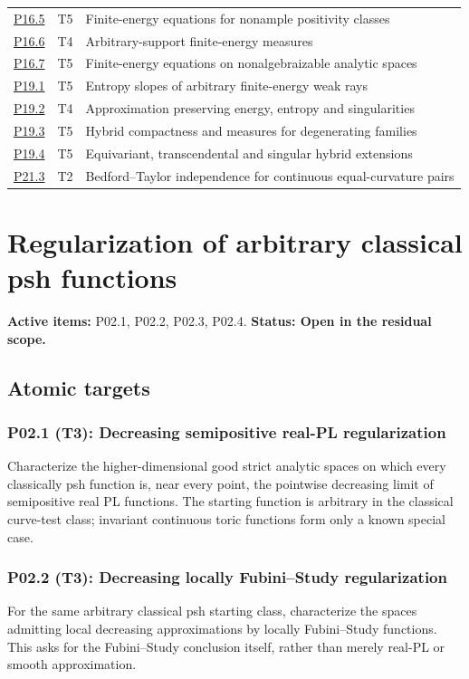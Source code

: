 \documentclass[11pt,a4paper]{article}
\theoremstyle{definition}
\theoremstyle{remark}
\begin{document}
\begin{longtable}{@{}p{}p{}p{}@{}}
\hyperref[atom:P16.5]{P16.5} & T5 & Finite-energy equations for nonample positivity classes\\
\hyperref[atom:P16.6]{P16.6} & T4 & Arbitrary-support finite-energy measures\\
\hyperref[atom:P16.7]{P16.7} & T5 & Finite-energy equations on nonalgebraizable analytic spaces\\
\hyperref[atom:P19.1]{P19.1} & T5 & Entropy slopes of arbitrary finite-energy weak rays\\
\hyperref[atom:P19.2]{P19.2} & T4 & Approximation preserving energy, entropy and singularities\\
\hyperref[atom:P19.3]{P19.3} & T5 & Hybrid compactness and measures for degenerating families\\
\hyperref[atom:P19.4]{P19.4} & T5 & Equivariant, transcendental and singular hybrid extensions\\
\hyperref[atom:P21.3]{P21.3} & T2 & Bedford--Taylor independence for continuous equal-curvature pairs\\
\end{longtable}
\clearpage\section{Regularization of arbitrary classical psh functions}
\label{family:1}
\noindent\textbf{Active items:} P02.1, P02.2, P02.3, P02.4. \textbf{Status: Open in the residual scope.}

\subsection{Atomic targets}
\subsubsection*{P02.1 (T3): Decreasing semipositive real-PL regularization}
\label{atom:P02.1}
Characterize the higher-dimensional good strict analytic spaces on which every classically psh function is, near every point, the pointwise decreasing limit of semipositive real PL functions. The starting function is arbitrary in the classical curve-test class; invariant continuous toric functions form only a known special case.

\subsubsection*{P02.2 (T3): Decreasing locally Fubini--Study regularization}
\label{atom:P02.2}
For the same arbitrary classical psh starting class, characterize the spaces admitting local decreasing approximations by locally Fubini--Study functions. This asks for the Fubini--Study conclusion itself, rather than merely real-PL or smooth approximation.
\end{document}
